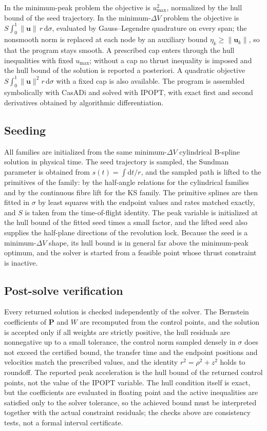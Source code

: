 \documentclass[a4paper,fleqn]{cas-sc}
\begin{document}
In the minimum-peak problem the objective is $u_{\max}^2$, normalized by the
hull bound of the seed trajectory. In the minimum-$\Delta V$ problem the
objective is $S\int_0^1\lVert\mathbf u\rVert\,r\,\mathrm{d}\sigma$, evaluated
by Gauss--Legendre quadrature on every span; the nonsmooth norm is replaced at
each node by an auxiliary bound $\eta_k\geq\lVert\mathbf u_k\rVert$, so that
the program stays smooth. A prescribed cap enters through the hull
inequalities with fixed $u_{\max}$; without a cap no thrust inequality is
imposed and the hull bound of the solution is reported a posteriori. A
quadratic objective $S\int_0^1\lVert\mathbf u\rVert^2 r\,\mathrm{d}\sigma$
with a fixed cap is also available. The program is assembled symbolically
with CasADi and solved with IPOPT, with exact first and second derivatives
obtained by algorithmic differentiation.

\subsection{Seeding}

All families are initialized from the same minimum-$\Delta V$ cylindrical
B-spline solution in physical time. The seed trajectory is sampled, the
Sundman parameter is obtained from $s(t)=\int\mathrm{d}t/r$, and the sampled
path is lifted to the primitives of the family: by the half-angle relations
for the cylindrical families and by the continuous fibre lift for the KS
family. The primitive splines are then fitted in $\sigma$ by least squares
with the endpoint values and rates matched exactly, and $S$ is taken from the
time-of-flight identity. The peak variable is initialized at the hull bound
of the fitted seed times a small factor, and the lifted seed also supplies
the half-plane directions of the revolution lock. Because the seed is a
minimum-$\Delta V$ shape, its hull bound is in general far above the
minimum-peak optimum, and the solver is started from a feasible point whose
thrust constraint is inactive.

\subsection{Post-solve verification}

Every returned solution is checked independently of the solver. The
Bernstein coefficients of $\mathbf P$ and $W$ are recomputed from the control
points, and the solution is accepted only if all weights are strictly
positive, the hull residuals are nonnegative up to a small tolerance, the
control norm sampled densely in $\sigma$ does not exceed the certified bound,
the transfer time and the endpoint positions and velocities match the
prescribed values, and the identity $r^2=\rho^2+z^2$ holds to roundoff. The
reported peak acceleration is the hull bound of the returned control points,
not the value of the IPOPT variable. The hull condition itself is exact, but
the coefficients are evaluated in floating point and the active inequalities
are satisfied only to the solver tolerance, so the achieved bound must be
interpreted together with the actual constraint residuals; the checks above
are consistency tests, not a formal interval certificate.
\end{document}
